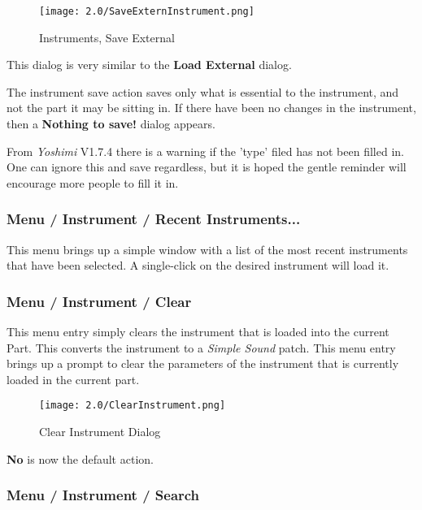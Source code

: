 \begin{figure}[H]
   \centering
   \texttt{[image: 2.0/SaveExternInstrument.png]}
   \caption{Instruments, Save External}
   \label{fig:instruments_save_external}
\end{figure}

   This dialog is very similar to the \textbf{Load External} dialog.

   The instrument save action saves only what is essential to the instrument,
   and not the part it may be sitting in.  If there have been no changes in the
   instrument, then a \textbf{Nothing to save!} dialog appears.

   From \textsl{Yoshimi} V1.7.4 there is a warning if the 'type' filed has
   not been filled in. One can ignore this and save regardless, but it is
   hoped the gentle reminder will encourage more people to fill it in.

\subsubsection{Menu / Instrument / Recent Instruments...}
\label{subsubsec:menu_instrument_recent}

   This menu brings up a simple window with a list of the most recent
   instruments that have been selected.  A single-click on the desired
   instrument will load it.

\subsubsection{Menu / Instrument / Clear}
\label{subsubsec:menu_instrument_clear}

   This menu entry simply clears the instrument that is loaded into the current
   Part.  This converts the instrument to a
   \textsl{Simple Sound} patch.
   This menu entry brings up a prompt to clear the parameters of the
   instrument that is currently loaded in the current part.

\begin{figure}[H]
   \centering
   \texttt{[image: 2.0/ClearInstrument.png]}
   \caption{Clear Instrument Dialog}
   \label{fig:clear_instrument_dialog}
\end{figure}

   \textbf{No} is now the default action.

\subsubsection{Menu / Instrument / Search}
\label{subsubsec:menu_instrument_search}

